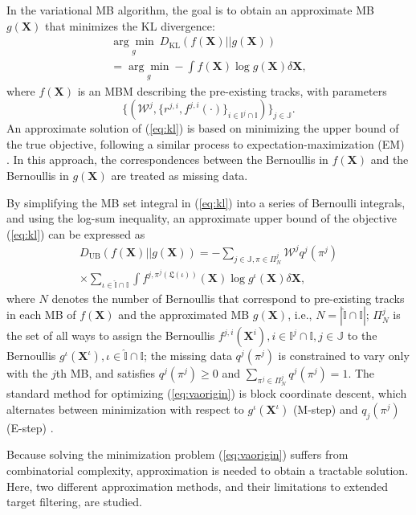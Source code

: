 \documentclass[journal]{IEEEtran}
\begin{document}
In the variational MB algorithm, the goal is to obtain an approximate MB $g(\mathbf{X})$ that minimizes the KL divergence:
\begin{multline}
\underset{g}{\arg\min}~D_{\text{KL}}(f(\mathbf{X})||g(\mathbf{X})) \\= \underset{g}{\arg\min}-\int f(\mathbf{X})\log g(\mathbf{X})\delta\mathbf{X},
\label{eq:kl}
\end{multline}
where $f(\mathbf{X})$ is an MBM describing the pre-existing tracks, with parameters
\begin{equation}
    \{(\mathcal{W}^j,\{r^{j,i},f^{j,i}(\cdot)\}_{i\in\mathbb{I}^j\cap\mathbb{I}})\}_{j\in\mathbb{J}}.
\end{equation}
An approximate solution of (\ref{eq:kl}) is based on minimizing the upper bound of the true objective, following a similar process to expectation-maximization (EM) \cite{em}. In this approach, the correspondences between the Bernoullis in $f(\mathbf{X})$ and the Bernoullis in $g(\mathbf{X})$ are treated as missing data. 

By simplifying the MB set integral in (\ref{eq:kl}) into a series of Bernoulli integrals, and using the log-sum inequality, an approximate upper bound of the objective (\ref{eq:kl}) can be expressed as \cite{variational}
\begin{multline}
D_{\text{UB}}(f(\mathbf{X})||g(\mathbf{X}))= -\sum_{j\in\mathbb{J},\pi\in\Pi^j_N}\mathcal{W}^jq^j(\pi^j)\\\times\sum_{\iota\in\hat{\mathbb{I}}\cap\mathbb{I}}\int f^{j,\pi^j(\mathfrak{L}(\iota))}(\mathbf{X})\log g^{\iota}(\mathbf{X})\delta \mathbf{X},
\label{eq:vaorigin}
\end{multline}
where $N$ denotes the number of Bernoullis that correspond to pre-existing tracks in each MB of $f(\mathbf{X})$ and the approximated MB $g(\mathbf{X})$, i.e., $N=|\hat{\mathbb{I}}\cap\mathbb{I}|$; $\Pi^j_N$ is the set of all ways to assign the Bernoullis $f^{j,i}(\mathbf{X}^i), i\in\mathbb{I}^j\cap\mathbb{I}, j\in\mathbb{J}$ to the Bernoullis $g^{\iota}(\mathbf{X}^{\iota}), \iota\in\hat{\mathbb{I}}\cap\mathbb{I}$; the missing data $q^j(\pi^j)$ is constrained to vary only with the $j$th MB, and satisfies $q^j(\pi^j)\geq0$ and  $\sum_{\pi^j\in\Pi^j_N} q^j(\pi^j) = 1$. The standard method for optimizing (\ref{eq:vaorigin}) is block coordinate descent, which alternates between minimization with respect to $g^{\iota}(\mathbf{X}^{\iota})$ (M-step) and $q_j(\pi^j)$ (E-step) \cite{variational}.

Because solving the minimization problem (\ref{eq:vaorigin}) suffers from combinatorial complexity, approximation is needed to obtain a tractable solution. Here, two different approximation methods, and their limitations to extended target filtering, are studied.
\end{document}
